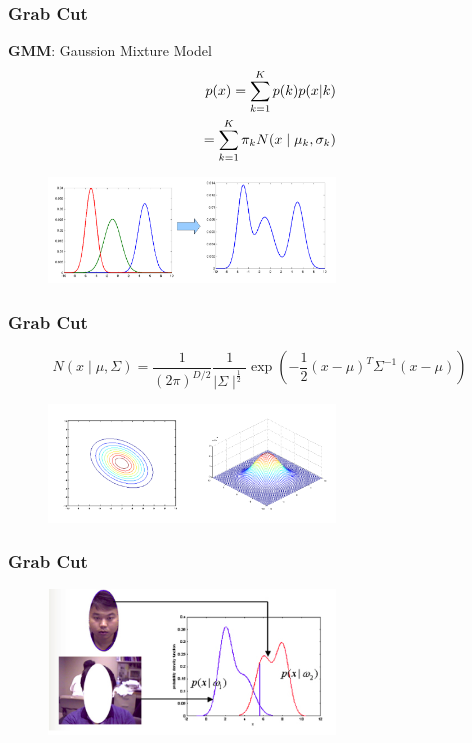 \documentclass[notheorems,mathserif,table,compress]{beamer}  %
\begin{document}
\begin{frame}
\frametitle{Grab Cut}
\textbf{GMM}: Gaussion Mixture Model\\
\begin{displaymath}
\begin{split}
p(x)=\sum_{k=1}^K p(k)p(x|k) \\
\hspace{0.2in}=\sum_{k=1}^K \pi_k N(x \mid \mu_k, \sigma_k)
\end{split}
\end{displaymath}
\begin{figure}[!ht]
    \centering
    \includegraphics[width=3.0in]{GMM}
\end{figure}
\end{frame}

\begin{frame}
\frametitle{Grab Cut}
\begin{displaymath}
N(x \mid \mu, \Sigma)= \frac{1}{(2\pi)^{D/2}}\frac{1}{\mid \Sigma \mid^{\frac{1}{2}}}\exp(-\frac{1}{2}(x-\mu)^T \Sigma^{-1} (x-\mu))
\end{displaymath}
\begin{figure}[!ht]
    \centering
    \includegraphics[width=3.0in]{GMM1}
\end{figure}
\end{frame}

\begin{frame}
\frametitle{Grab Cut}
  \begin{figure}[!ht]
  \centering
   \includegraphics[width=3.0in]{GMM2.png}
   \end{figure}
\end{frame}
\end{document}
